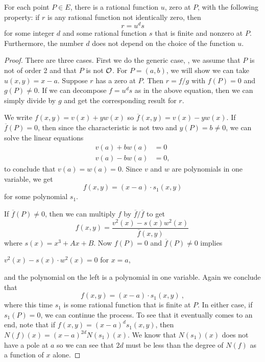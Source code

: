 \begin{theo}
\label{t4.3}
For each point $P\in E$, there is a rational function $u$, zero at $P$, with the following property: if $r$ is any rational function not identically zero, then
\begin{equation}
\label{eq1.3}
r=u^{d} s
\end{equation}
for some integer $d$ and some rational function $s$ that is finite and nonzero at $P$. Furthermore, the number $d$ does not depend on the choice of the function $u$.
\end{theo}

\begin{proof}
There are three cases. First we do the generic case, \ie, we assume that $P$ is not of order 2 and that $P$ is not $\mathcal{O}$. For $P=(a,b)$, we will show we can take $u(x,y)=x-a$. Suppose $r$ has a zero at $P$. Then $r=f/g$ with $f(P)=0$ and $g(P)\neq 0$. If we can decompose $f=u^{d}s$ as in the above equation, then we can simply divide by $g$ and get the corresponding result for $r$.

We write $f(x,y)=v(x)+yw(x)$ so $\overline{f}(x,y)=v(x)-yw(x)$. If $\overline{f}(P)=0$, then since the characteristic is not two and $y(P)=b\neq 0$, we can solve the linear equations
\begin{align*}
v(a)+bw(a)&=0\\
v(a)-bw(a)&=0,
\end{align*}
to conclude that $v(a)=w(a)=0$. Since $v$ and $w$ are polynomials in one variable, we get
\[f(x,y)=(x-a)\cdot s_{1}(x,y)\]
for some polynomial $s_{1}$.

If $\overline{f}(P)\neq 0$, then we can multiply $f$ by $\overline{f}/\overline{f}$ to get
\[f(x,y)=\frac{v^{2}(x)-s(x)w^{2}(x)}{\overline{f}(x,y)}\,\]
where $s(x)=x^{3}+Ax+B$. Now $f(P)=0$ and $\overline{f}(P)\neq 0$ implies
\begin{center}
$v^{2}(x)-s(x)\cdot w^{2}(x)=0$ for $x=a$,
\end{center}
and the polynomial on the left is a polynomial in one variable. Again we conclude that
\[f(x,y)=(x-a)\cdot s_{1}(x,y)\ ,\]
where this time $s_{1}$ is some rational function that is finite at $P$. In either case, if $s_{1}(P)=0$, we can continue the process. To see that it eventually comes to an end, note that if $f(x,y)=(x-a)^{d}s_{1}(x,y)$, then $N(f)(x)=(x-a)^{2d}N(s_{1})(x)$. We know that $N(s_{1})(x)$ does not have a pole at $a$ so we can see that $2d$ must be less than the degree of $N(f)$ as a function of $x$ alone.


\end{proof}
